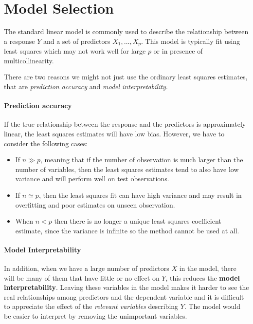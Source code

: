 \section{Model Selection}
The standard linear model is commonly used to describe the relationship between a response $Y$ and a set of predictors $X_1, \dots, X_p$. This model is typically fit using least squares which may not work well for large $p$ or in presence of multicollinearity.

There are two reasons we might not just use the ordinary least squares estimates, that are \textit{prediction accuracy} and \textit{model interpretability}.

\paragraph*{Prediction accuracy} 
If the true relationship between the response and the predictors is approximately linear, the least squares estimates will have low bias. However, we have to consider the following cases:
\begin{itemize}
    \item If $n \gg p$, meaning that if the number of observation is much larger than the number of variables, then the least squares estimates tend to also have low variance and will perform well on test observations.
    \item If $n \simeq p$, then the least squares fit can have high variance and may result in overfitting and poor estimates on unseen observation.
    \item When $n < p$ then there is no longer a unique least squares coefficient estimate, since the variance is infinite so the method cannot be used at all.
\end{itemize}

\paragraph*{Model Interpretability} 
In addition, when we have a large number of predictors $X$ in the model, there will be many of them that have little or no effect on $Y$, this reduces the \textbf{model interpretability}. Leaving these variables in the model makes it harder to see the real relationships among predictors and the dependent variable and it is difficult to appreciate the effect of the \textit{relevant variables} describing $Y$. The model would be easier to interpret by removing the unimportant variables.

